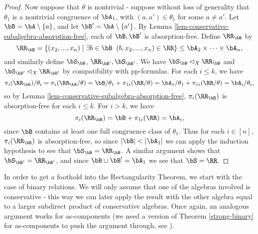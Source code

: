 \begin{proof}
Now suppose that $\theta$ is nontrivial - suppose without loss of generality that $\theta_1$ is a nontrivial congruence of $\bA_1$, with $(a,a') \in \theta_1$ for some $a \ne a'$. Let $\bB = \bA \setminus \{a\}$, and let $\bB' = \bA\setminus\{a'\}$. By Lemma \ref{lem-conservative-subalgebra-absorption-free}, each of $\bB, \bB'$ is absorption-free. Define $\RR_\bB$ by
\[
\RR_\bB = \{(x_2, ..., x_n) \mid \exists b \in \bB \;\; (b,x_2, ..., x_n) \in \RR\} \le \bA_2 \times \cdots \times \bA_n,
\]
and similarly define $\bS_\bB$, $\RR_{\bB'}, \bS_{\bB'}$. We have $\bS_\bB \lhd_X \RR_\bB$ and $\bS_{\bB'} \lhd_X \RR_{\bB'}$ by compatibility with pp-formulas. For each $i \le k$, we have
\[
\pi_i(\RR_\bB)/\theta_i = \pi_i(\RR_\bB/\theta) = \bB/\theta_1 + \pi_{1i}(\RR/\theta) = \bA_1/\theta_1 + \pi_{1i}(\RR/\theta) = \bA_i/\theta_i,
\]
so by Lemma \ref{lem-conservative-subalgebra-absorption-free}, $\pi_i(\RR_\bB)$ is absorption-free for each $i \le k$. For $i > k$, we have
\[
\pi_i(\RR_\bB) = \bB + \pi_{1i}(\RR) = \bA_i,
\]
since $\bB$ contains at least one full congruence class of $\theta_1$. Thus for each $i \in [n]$, $\pi_i(\RR_\bB)$ is absorption-free, so since $|\bB| < |\bA_1|$ we can apply the induction hypothesis to see that $\bS_\bB = \RR_\bB$. A similar argument shows that $\bS_{\bB'} = \RR_{\bB'}$, and since $\bB \cup \bB' = \bA_1$ we see that $\bS = \RR$.
\end{proof}

In order to get a foothold into the Rectangularity Theorem, we start with the case of binary relations. We will only assume that one of the algebras involved is conservative - this way we can later apply the result with the other algebra equal to a larger subdirect product of conservative algebras. Once again, an analogous argument works for as-components (we need a version of Theorem \ref{strong-binary} for as-components to push the argument through, see \cite{bulatov-conservative-rerevisited}).%


